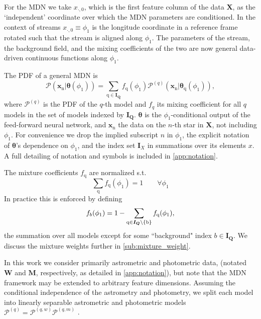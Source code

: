 \documentclass[twocolumn]{aastex631}
\newcommand{\mrm}[1]{\mathrm{#1}}
\newcommand{\mbs}[1]{\boldsymbol{#1}}
\newcommand{\mbf}[1]{\mathbf{#1}}
\newcommand{\mcal}[1]{\mathcal{#1}}
\newcommand{\pdf}{\mcal{P}}
\newcommand{\prior}{\mcal{\pi}}
\newcommand{\nth}[1]{{#1}_{\mrm{n}}}  %
\newcommand{\qth}[1]{{#1}_{\mrm{q}}}  %
\newcommand{\smallcomponent}[2]{#2^{\scriptscriptstyle (#1)}}
\newcommand{\cmp}[2]{\smallcomponent{#1}{#2}}
\begin{document}
        For the MDN we take $x_{\cdot, 0}$, which is the first feature column of the data $\mbf{X}$, as the `independent' coordinate over which the MDN parameters are conditioned. In the context of streams $x_{\cdot, 0} \equiv \phi_1$ is the longitude coordinate in a reference frame rotated such that the stream is aligned along $\phi_1$. The parameters of the stream, the background field, and the mixing coefficients of the two are now general data-driven continuous functions along $\phi_1$.

        The PDF of a general MDN is
        \begin{equation} \label{eq:general_mixture_network}
            \!\!\! \pdf(\nth{\mbs{x}} | \mbs{\theta}(\phi_1))
            \!=\! \sum_{\mrm{q} \in \mbs{I_Q}} \! \qth{f}(\phi_1) \cmp{q}{\pdf}(\nth{\mbs{x}}|\qth{\mbs{\theta}}(\phi_1)),
        \end{equation}
        where $\cmp{q}{\pdf}$ is the PDF of the $q$-th model and $f_q$ its mixing coefficient for all $q$ models in the set of models indexed by $\mbs{I_Q}$. $\mbs{\theta}$ is the $\phi_1$-conditional output of the feed-forward neural network, and $\nth{\mbs{x}}$ the data on the $n$-th star in $\mbs{X}$, not including $\phi_1$. For convenience we drop the implied subscript $n$ in $\phi_1$, the explicit notation of $\mbs{\theta}$'s dependence on $\phi_1$, and the index set $\mbs{I}_X$ in summations over its elements $x$. A full detailing of notation and symbols is included in \autoref{app:notation}.

        The mixture coefficients $\qth{f}$ are normalized s.t.
        \begin{equation}
            \sum_{\mrm{q}} \qth{f}(\phi_1) = 1 \qquad \forall \phi_1
        \end{equation}
        In practice this is enforced by defining
        \begin{equation} \label{eq:mixture_weight_normalization}
            f_{b}(\phi_1) = 1 - \sum_{\rm{q}\in \mbs{I_Q}\backslash \{b\}} \qth{f}(\phi_1),
        \end{equation}
        the summation over all models except for some ``background" index $b \in \mbs{I_Q}$.
        We discuss the mixture weights further in \autoref{sub:mixture_weight}.

        In this work we consider primarily astrometric and photometric data, (notated $\mbs{W}$ and $\mbs{M}$, respectively, as detailed in \autoref{app:notation}), but note that the MDN framework may be extended to arbitrary feature dimensions.
        Assuming the conditional independence of the astrometry and photometry,
        we split each model into linearly separable astrometric and photometric models $\cmp{q}{\pdf} = \cmp{q,w}{\pdf} \cmp{q,m}{\pdf}$ .
\end{document}

